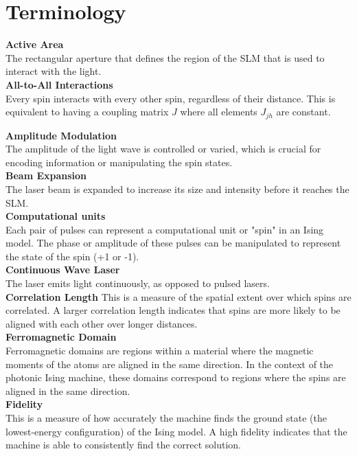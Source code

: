 \section{Terminology}

\textbf{Active Area} \\
The rectangular aperture that defines the region of the SLM that is used to interact with the light.\\

\textbf{All-to-All Interactions} \\
Every spin interacts with every other spin, regardless of their distance. This is equivalent to having a coupling matrix $J$ where all elements $J_{jh}$ are constant.

\textbf{Amplitude Modulation} \\
The amplitude of the light wave is controlled or varied, which is crucial for encoding information or manipulating the spin states.\\

\textbf{Beam Expansion} \\
The laser beam is expanded to increase its size and intensity before it reaches the SLM. \\

\textbf{Computational units} \\
Each pair of pulses can represent a computational unit or "spin" in an Ising model. The phase or amplitude of these pulses can be manipulated to represent the state of the spin (+1 or -1). \\

\textbf{Continuous Wave Laser} \\
The laser emits light continuously, as opposed to pulsed lasers.\\

\textbf{Correlation Length}
This is a measure of the spatial extent over which spins are correlated. A larger correlation length indicates that spins are more likely to be aligned with each other over longer distances. \\

\textbf{Ferromagnetic Domain}\\
Ferromagnetic domains are regions within a material where the magnetic moments of the atoms are aligned in the same direction. In the context of the photonic Ising machine, these domains correspond to regions where the spins are aligned in the same direction. \\

\textbf{Fidelity} \\
This is a measure of how accurately the machine finds the ground state (the lowest-energy configuration) of the Ising model. A high fidelity indicates that the machine is able to consistently find the correct solution. \\

